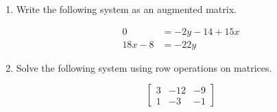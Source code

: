 \documentclass[11pt]{article}
\begin{document}
\begin{enumerate}
% 

\item %
\providecommand{\stxKnowl}{}\renewcommand{\stxKnowl}[1]{#1}
\providecommand{\stxOuttro}{}\renewcommand{\stxOuttro}[1]{#1}
\providecommand{\stxTitle}{}\renewcommand{\stxTitle}[1]{#1}
\renewcommand{\stxOuttro}[1]{}
\stxKnowl{
Write the following system as an augmented matrix.

\[\begin{aligned} 0 &= -2y - 14 + 15x \\ 18x - 8 &= -22y \end{aligned}\]

\stxOuttro{
Solution

\[\begin{aligned} -15x + 2y &= -14 \\ 18x + 22y &= 8 \end{aligned}\]

\[\boxed{ \left[\begin{array}{cc|c} -15 & 2 & -14 \\ 18 & 22 & 8 \end{array}\right] }\]

}
}

\newpage

% 

\item %
\providecommand{\stxKnowl}{}\renewcommand{\stxKnowl}[1]{#1}
\providecommand{\stxOuttro}{}\renewcommand{\stxOuttro}[1]{#1}
\providecommand{\stxTitle}{}\renewcommand{\stxTitle}[1]{#1}
\renewcommand{\stxOuttro}[1]{}
\stxKnowl{
Solve the following system using row operations on matrices.

\[\left[\begin{array}{cc|c} 3 & -12 & -9 \\ 1 & -3 & -1 \end{array}\right]\]

\stxOuttro{
Solution

}}
\end{enumerate}
\end{document}
